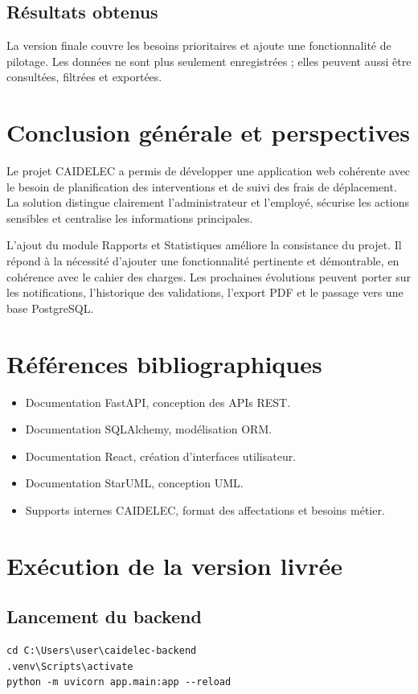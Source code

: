 \documentclass[12pt,a4paper,oneside]{report}
\begin{document}
\section{Résultats obtenus}
La version finale couvre les besoins prioritaires et ajoute une fonctionnalité de pilotage. Les données ne sont plus seulement enregistrées ; elles peuvent aussi être consultées, filtrées et exportées.

\chapter{Conclusion générale et perspectives}
Le projet CAIDELEC a permis de développer une application web cohérente avec le besoin de planification des interventions et de suivi des frais de déplacement. La solution distingue clairement l'administrateur et l'employé, sécurise les actions sensibles et centralise les informations principales.

L'ajout du module Rapports et Statistiques améliore la consistance du projet. Il répond à la nécessité d'ajouter une fonctionnalité pertinente et démontrable, en cohérence avec le cahier des charges. Les prochaines évolutions peuvent porter sur les notifications, l'historique des validations, l'export PDF et le passage vers une base PostgreSQL.

\chapter*{Références bibliographiques}
\begin{itemize}
  \item Documentation FastAPI, conception des APIs REST.
  \item Documentation SQLAlchemy, modélisation ORM.
  \item Documentation React, création d'interfaces utilisateur.
  \item Documentation StarUML, conception UML.
  \item Supports internes CAIDELEC, format des affectations et besoins métier.
\end{itemize}

\appendix
\chapter{Exécution de la version livrée}
\section{Lancement du backend}
\begin{verbatim}
cd C:\Users\user\caidelec-backend
.venv\Scripts\activate
python -m uvicorn app.main:app --reload
\end{verbatim}
\end{document}

